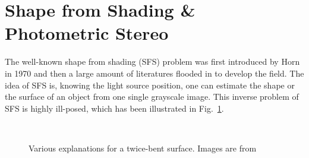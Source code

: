\section{Shape from Shading \& Photometric Stereo}

The well-known shape from shading (SFS) problem was first introduced by Horn~\cite{horn1970shape} in 1970 and then a large amount of literatures flooded in to develop the field.
The idea of SFS is, knowing the light source position, one can estimate the shape or the surface of an object from one single grayscale image.
This inverse problem of SFS is highly ill-posed, which has been illustrated in Fig.~\ref{fig:paint}.


\begin{figure}[!ht]
\centering
{}
\\
\caption{Various explanations for a twice-bent surface. Images are from~\cite{adelson1996perception}}
\label{fig:paint}
\end{figure}



